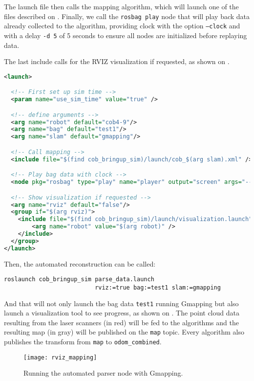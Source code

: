 The launch file then calls the mapping algorithm, which will launch one of the files described on . Finally, we call the \texttt{rosbag play} node that will play back data already collected to the algorithm, providing clock with the option \texttt{--clock} and with a delay \texttt{-d 5} of 5 seconds to ensure all nodes are initialized before replaying data.

The last include calls for the RVIZ visualization if requested, as shown on .

\begin{lstlisting}[caption={Automated data parser.},label={lst:parser},language=XML]
<launch>

  <!-- First set up sim time -->
  <param name="use_sim_time" value="true" />

  <!-- define arguments -->
  <arg name="robot" default="cob4-9"/>
  <arg name="bag" default="test1"/>
  <arg name="slam" default="gmapping"/>

  <!-- Call mapping -->
  <include file="$(find cob_bringup_sim)/launch/cob_$(arg slam).xml" />

  <!-- Play bag data with clock -->
  <node pkg="rosbag" type="play" name="player" output="screen" args="--clock -q -d 5 $(find cob_bringup_sim)/bags/$(arg bag).bag"/>

  <!-- Show visualization if requested -->
  <arg name="rviz" default="false"/>
  <group if="$(arg rviz)">
    <include file="$(find cob_bringup_sim)/launch/visualization.launch" >
        <arg name="robot" value="$(arg robot)" />
    </include>
  </group>
</launch>
\end{lstlisting}

Then, the automated reconstruction can be called:

\begin{verbatim}
roslaunch cob_bringup_sim parse_data.launch
                          rviz:=true bag:=test1 slam:=gmapping
\end{verbatim}

And that will not only launch the bag data \texttt{test1} running Gmapping but also launch a visualization tool to see progress, as shown on . The point cloud data resulting from the laser scanners (in red) will be fed to the algorithms and the resulting map (in gray) will be published on the \texttt{map} topic. Every algorithm also publishes the transform from \texttt{map} to \texttt{odom\_combined}.

\begin{figure}[!ht]
    \centering
    \texttt{[image: rviz\_mapping]}
    \caption{Running the automated parser node with Gmapping.}
    \label{fig:rviz_mapping}
\end{figure}

